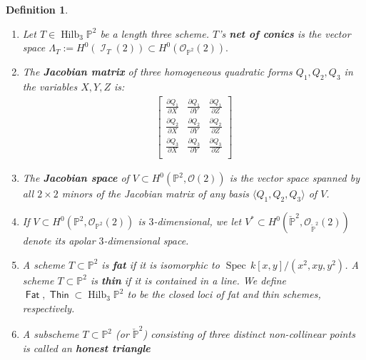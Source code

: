 \documentclass[reqno, 11pt]{amsart}
\theoremstyle{plain}
\newtheorem{definition}[theorem]{Definition}
\theoremstyle{remark}
\renewcommand{\P}{\mathbb{P}}
\DeclareMathOperator{\Hilb}{Hilb}
\DeclareMathOperator{\I}{\mathcal{I}}
\renewcommand{\O}{\mathcal{O}}
\DeclareMathOperator{\Thin}{\mathsf{Thin}}
\DeclareMathOperator{\Fat}{\mathsf{Fat}}
\DeclareMathOperator{\spec}{Spec \,}
\begin{document}
\begin{definition}
  \label{definition:NetZ} 
  \begin{enumerate}
    \item Let $T \in \Hilb_{3}\P^{2}$ be a length three scheme. $T$'s {\bf net
    of conics} is the vector space
  $\Lambda_{T} := H^{0}(\I_{T}(2)) \subset H^{0}(\O_{\P^{2}}(2)).$
  \item The {\bf Jacobian matrix} of three homogeneous quadratic forms
  $Q_{1},Q_{2},Q_{3}$ in the variables $X,Y,Z$ is:
  \begin{eqnarray}\label{jacmatrix}
    \begin{bmatrix}
      \frac{\partial Q_{1}}{\partial X} & \frac{\partial Q_{1}}{\partial Y} & \frac{\partial Q_{1}}{\partial Z} \\
      \frac{\partial Q_{2}}{\partial X} & \frac{\partial Q_{2}}{\partial Y} & \frac{\partial Q_{2}}{\partial Z} \\
      \frac{\partial Q_{3}}{\partial X} & \frac{\partial Q_{3}}{\partial Y} & \frac{\partial Q_{3}}{\partial Z} \\
    \end{bmatrix}
  \end{eqnarray}
  \item The {\bf Jacobian space} of $V \subset H^{0}(\P^{2}, \O(2))$ is the vector space spanned by all $2 \times 2$ minors of the Jacobian matrix of any basis $\langle Q_{1}, Q_{2}, Q_{3} \rangle$ of $V$.
  \item If $V \subset H^{0}(\P^{2}, \O_{\P^{2}}(2))$ is $3$-dimensional, we
  let $V^{*} \subset H^{0}(\check{\P}^{2}, \O_{\check{\P}^{2}}(2))$ denote its apolar
  $3$-dimensional space.
  \item A scheme $T \subset \P^{2}$ is {\bf fat} if it is isomorphic to
  $\spec k[x,y]/(x^{2},xy,y^{2})$. A scheme $T \subset \P^{2}$ is {\bf
    thin} if it is contained in a line. We define $\Fat, \Thin \subset \Hilb_{3}\P^{2}$ to be the
  closed loci of fat and thin schemes, respectively.
  \item A subscheme $T \subset \P^{2}$ (or $\check{\P}^{2}$) consisting of three distinct non-collinear points is called an {\bf honest triangle}
  \end{enumerate}
\end{definition}
\end{document}
